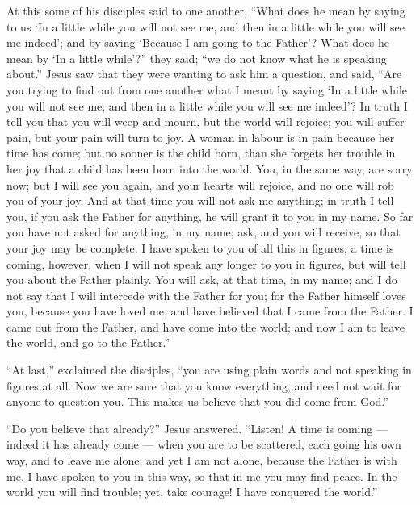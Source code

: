  At this some of his disciples said to one another, ``What
does he mean by saying to us `In a little while you will not see me, and
then in a little while you will see me indeed'; and by saying `Because I
am going to the Father'?  What does he mean by `In a little
while'?'' they said; ``we do not know what he is speaking about.''
 Jesus saw that they were wanting to ask him a question,
and said, ``Are you trying to find out from one another what I meant by
saying `In a little while you will not see me; and then in a little
while you will see me indeed'?  In truth I tell you that
you will weep and mourn, but the world will rejoice; you will suffer
pain, but your pain will turn to joy.  A woman in labour is
in pain because her time has come; but no sooner is the child born, than
she forgets her trouble in her joy that a child has been born into the
world.  You, in the same way, are sorry now; but I will see
you again, and your hearts will rejoice, and no one will rob you of your
joy.  And at that time you will not ask me anything; in
truth I tell you, if you ask the Father for anything, he will grant it
to you in my name.  So far you have not asked for anything,
in my name; ask, and you will receive, so that your joy may be complete.
 I have spoken to you of all this in figures; a time is
coming, however, when I will not speak any longer to you in figures, but
will tell you about the Father plainly.  You will ask, at
that time, in my name; and I do not say that I will intercede with the
Father for you;  for the Father himself loves you, because
you have loved me, and have believed that I came from the Father.
 I came out from the Father, and have come into the world;
and now I am to leave the world, and go to the Father.''

 ``At last,'' exclaimed the disciples, ``you are using
plain words and not speaking in figures at all.  Now we are
sure that you know everything, and need not wait for anyone to question
you. This makes us believe that you did come from God.''

 ``Do you believe that already?'' Jesus answered.
 ``Listen! A time is coming --- indeed it has already come
--- when you are to be scattered, each going his own way, and to leave
me alone; and yet I am not alone, because the Father is with me.
 I have spoken to you in this way, so that in me you may
find peace. In the world you will find trouble; yet, take courage! I
have conquered the world.''

